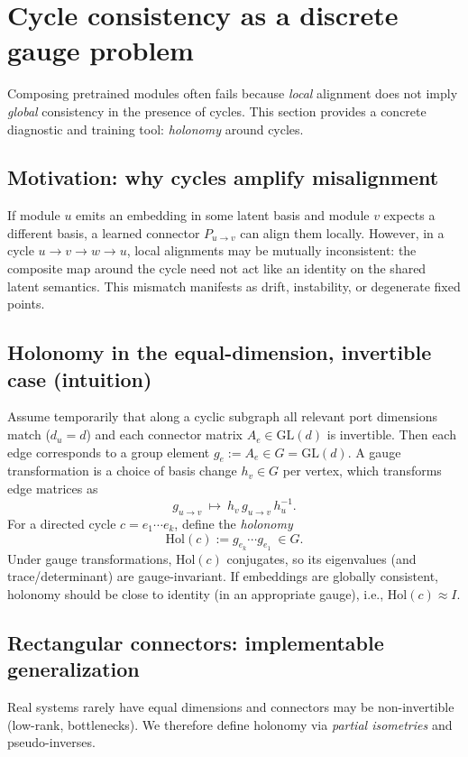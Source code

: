 \documentclass[11pt]{article}
\theoremstyle{definition}
\theoremstyle{plain}
\theoremstyle{remark}
\begin{document}
\newpage

\section{Cycle consistency as a discrete gauge problem}
\label{sec:gauge}

Composing pretrained modules often fails because \emph{local} alignment does not imply \emph{global} consistency in the presence of cycles.
This section provides a concrete diagnostic and training tool: \emph{holonomy} around cycles.

\subsection{Motivation: why cycles amplify misalignment}
If module $u$ emits an embedding in some latent basis and module $v$ expects a different basis, a learned connector $P_{u\to v}$ can align them locally.
However, in a cycle $u\to v\to w\to u$, local alignments may be mutually inconsistent:
the composite map around the cycle need not act like an identity on the shared latent semantics.
This mismatch manifests as drift, instability, or degenerate fixed points.

\subsection{Holonomy in the equal-dimension, invertible case (intuition)}
Assume temporarily that along a cyclic subgraph all relevant port dimensions match ($d_u=d$) and each connector matrix $A_e\in \mathrm{GL}(d)$ is invertible.
Then each edge corresponds to a group element $g_e:=A_e\in G=\mathrm{GL}(d)$.
A gauge transformation is a choice of basis change $h_v\in G$ per vertex, which transforms edge matrices as
\[
g_{u\to v}\ \mapsto\ h_v\, g_{u\to v}\, h_u^{-1}.
\]
For a directed cycle $c=e_1\cdots e_k$, define the \emph{holonomy}
\[
\mathrm{Hol}(c) := g_{e_k}\cdots g_{e_1}\ \in G.
\]
Under gauge transformations, $\mathrm{Hol}(c)$ conjugates, so its eigenvalues (and trace/determinant) are gauge-invariant.
If embeddings are globally consistent, holonomy should be close to identity (in an appropriate gauge), i.e., $\mathrm{Hol}(c)\approx I$.

\subsection{Rectangular connectors: implementable generalization}
Real systems rarely have equal dimensions and connectors may be non-invertible (low-rank, bottlenecks).
We therefore define holonomy via \emph{partial isometries} and pseudo-inverses.
\end{document}
